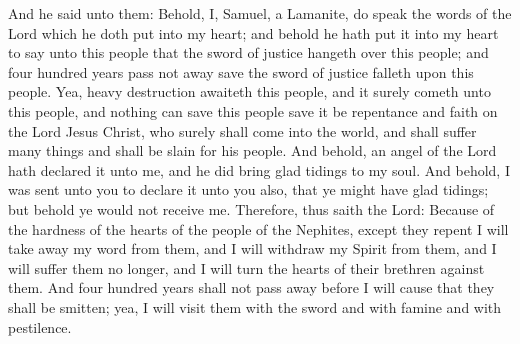 \bverse \iffalse And he said unto them: Behold, I, Samuel, a Lamanite, do speak the words of the Lord which he doth put into my heart; and behold he hath put it into my heart to say unto this people that the sword of justice hangeth over this people; and four hundred years pass not away save the sword of justice falleth upon this people. \fi
And he said unto them: Behold, I, Samuel, a Lamanite, do speak the words of the Lord which he doth put into my heart; and behold he hath put it into my heart to say unto this people that the sword of justice hangeth over this people; and four hundred years pass not away save the sword of justice falleth upon this people.
\bverse \iffalse Yea, heavy destruction awaiteth this people, and it surely cometh unto this people, and nothing can save this people save it be repentance and faith on the Lord Jesus Christ, who surely shall come into the world, and shall suffer many things and shall be slain for his people. \fi
Yea, heavy destruction awaiteth this people, and it surely cometh unto this people, and nothing can save this people save it be repentance and faith on the Lord Jesus Christ, who surely shall come into the world, and shall suffer many things and shall be slain for his people.
\bverse \iffalse And behold, an angel of the Lord hath declared it unto me, and he did bring glad tidings to my soul. And behold, I was sent unto you to declare it unto you also, that ye might have glad tidings; but behold ye would not receive me. \fi
And behold, an angel of the Lord hath declared it unto me, and he did bring glad tidings to my soul. And behold, I was sent unto you to declare it unto you also, that ye might have glad tidings; but behold ye would not receive me.
\bverse \iffalse Therefore, thus saith the Lord: Because of the hardness of the hearts of the people of the Nephites, except they repent I will take away my word from them, and I will withdraw my Spirit from them, and I will suffer them no longer, and I will turn the hearts of their brethren against them. \fi
Therefore, thus saith the Lord: Because of the hardness of the hearts of the people of the Nephites, except they repent I will take away my word from them, and I will withdraw my Spirit from them, and I will suffer them no longer, and I will turn the hearts of their brethren against them.
\bverse \iffalse And four hundred years shall not pass away before I will cause that they shall be smitten; yea, I will visit them with the sword and with famine and with pestilence. \fi
And four hundred years shall not pass away before I will cause that they shall be smitten; yea, I will visit them with the sword and with famine and with pestilence.
